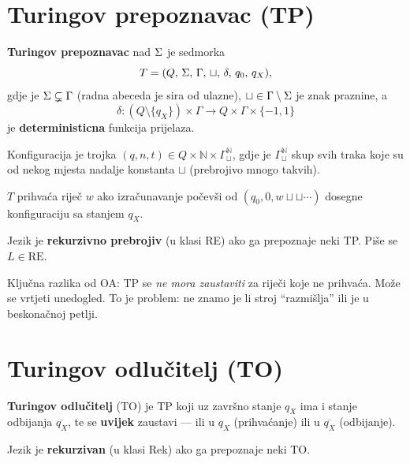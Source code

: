 \section{Turingov prepoznavac (TP)}

\begin{definicija}
\textbf{Turingov prepoznavac} nad $\Sigma$ je sedmorka
\[
  T = (Q,\, \Sigma,\, \Gamma,\, \sqcup,\, \delta,\, q_0,\, q_X),
\]
gdje je $\Sigma \subsetneq \Gamma$ (radna abeceda je sira od ulazne),
$\sqcup \in \Gamma \setminus \Sigma$ je znak praznine, a
\[
  \delta : (Q \setminus \{q_X\}) \times \Gamma \to Q \times \Gamma \times \{-1, 1\}
\]
je \textbf{deterministicna} funkcija prijelaza.

Konfiguracija je trojka $(q, n, t) \in Q \times \mathbb{N} \times \Gamma^\mathbb{N}_\sqcup$,
gdje je $\Gamma^\mathbb{N}_\sqcup$ skup svih traka koje su od nekog mjesta
nadalje konstanta $\sqcup$ (prebrojivo mnogo takvih).

$T$ prihvaća riječ $w$ ako izračunavanje počevši od
$(q_0, 0, w\sqcup\sqcup\cdots)$ dosegne konfiguraciju sa stanjem $q_X$.
\end{definicija}

\begin{definicija}
Jezik je \textbf{rekurzivno prebrojiv} (u klasi RE) ako ga prepoznaje
neki TP. Piše se $L \in \mathrm{RE}$.
\end{definicija}

Ključna razlika od OA: TP se \emph{ne mora zaustaviti} za riječi koje
ne prihvaća. Može se vrtjeti unedogled. To je problem: ne znamo
je li stroj ``razmišlja'' ili je u beskonačnoj petlji.

\section{Turingov odlučitelj (TO)}

\begin{definicija}
\textbf{Turingov odlučitelj} (TO) je TP koji uz završno stanje $q_X$
ima i stanje odbijanja $\overline{q_X}$, te se \textbf{uvijek} zaustavi ---
ili u $q_X$ (prihvaćanje) ili u $\overline{q_X}$ (odbijanje).

Jezik je \textbf{rekurzivan} (u klasi Rek) ako ga prepoznaje neki TO.
\end{definicija}

